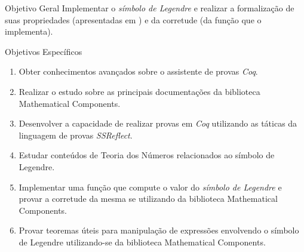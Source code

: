 \begin{frame}{Objetivo Geral}
    Implementar o \textit{símbolo de Legendre} e realizar a formalização de suas propriedades (apresentadas em \cite{book:2399854}) e da corretude (da função que o implementa). 
\end{frame}

\begin{frame}{Objetivos Específicos}
    \begin{enumerate}
            \item Obter conhecimentos avançados sobre o assistente de provas \textit{Coq}.
            \item Realizar o estudo sobre as principais documentações da biblioteca Mathematical Components.
            \item Desenvolver a capacidade de realizar provas em \textit{Coq} utilizando as táticas da linguagem de provas \textit{SSReflect}.
            \item Estudar conteúdos de Teoria dos Números relacionados ao símbolo de Legendre.
            \item Implementar uma função que compute o valor do \textit{símbolo de Legendre} e provar a corretude da mesma se utilizando da biblioteca Mathematical Components.
            \item Provar teoremas úteis para manipulação de expressões envolvendo o símbolo de Legendre utilizando-se da biblioteca Mathematical Components.
    \end{enumerate}
\end{frame}